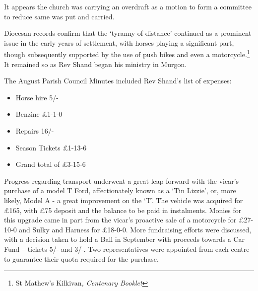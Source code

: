 \smallskip


It appears the church was carrying an overdraft as a motion to form a committee to reduce same was put and carried.



Diocesan records confirm that the `tyranny of distance' continued as a prominent issue in the early years of settlement, with horses playing a significant part, though subsequently supported by the use of push bikes and even a motorcycle.\footnote{St Mathew's Kilkivan\emph{, Centenary Booklet}} It remained so as Rev Shand began his ministry in Murgon.


The August Parish Council Minutes included Rev Shand's list of expenses:



\begin{itemize}

\item

  Horse hire 5/-

\item

  Benzine \pounds1-1-0

\item

  Repairs 16/-

\item

  Season Tickets \pounds1-13-6

\item

  Grand total of \pounds3-15-6

\end{itemize}



\smallskip


Progress regarding transport underwent a great leap forward with the vicar's purchase of a model T Ford, affectionately known as a `Tin Lizzie', or, more likely, Model A - a great improvement on the `T'. The vehicle was acquired for \pounds165, with \pounds75 deposit and the balance to be paid in instalments. Monies for this upgrade came in part from the vicar's proactive sale of a motorcycle for \pounds27-10-0 and Sulky and Harness for \pounds18-0-0. More fundraising efforts were discussed, with a decision taken to hold a Ball in September with proceeds towards a Car Fund -- tickets 5/- and 3/-. Two representatives were appointed from each centre to guarantee their quota required for the purchase.



